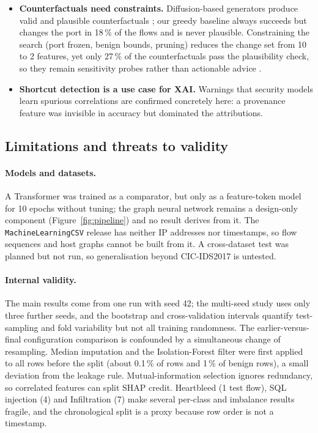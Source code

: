 \documentclass[11pt,a4paper]{article}
\begin{document}
\begin{itemize}
  \item \textbf{Counterfactuals need constraints.} Diffusion-based generators produce valid and plausible counterfactuals \parencite{galwaduge2025}; our greedy baseline always succeeds but changes the port in 18\,\% of the flows and is never plausible. Constraining the search (port frozen, benign bounds, pruning) reduces the change set from 10 to 2 features, yet only 27\,\% of the counterfactuals pass the plausibility check, so they remain sensitivity probes rather than actionable advice \parencite{mothilal2020}.
  \item \textbf{Shortcut detection is a use case for XAI.} Warnings that security models learn spurious correlations \parencite{arp2022} are confirmed concretely here: a provenance feature was invisible in accuracy but dominated the attributions.
\end{itemize}

\subsection{Limitations and threats to validity}
\paragraph{Models and datasets.} A Transformer was trained as a comparator, but only as a feature-token model for 10 epochs without tuning; the graph neural network remains a design-only component (Figure~\ref{fig:pipeline}) and no result derives from it. The \texttt{MachineLearningCSV} release has neither IP addresses nor timestamps, so flow sequences and host graphs cannot be built from it. A cross-dataset test was planned but not run, so generalisation beyond CIC-IDS2017 is untested.

\paragraph{Internal validity.} The main results come from one run with seed 42; the multi-seed study uses only three further seeds, and the bootstrap and cross-validation intervals quantify test-sampling and fold variability but not all training randomness. The earlier-versus-final configuration comparison is confounded by a simultaneous change of resampling. Median imputation and the Isolation-Forest filter were first applied to all rows before the split (about 0.1\,\% of rows and 1\,\% of benign rows), a small deviation from the leakage rule. Mutual-information selection ignores redundancy, so correlated features can split SHAP credit. Heartbleed (1 test flow), SQL injection (4) and Infiltration (7) make several per-class and imbalance results fragile, and the chronological split is a proxy because row order is not a timestamp.
\end{document}
